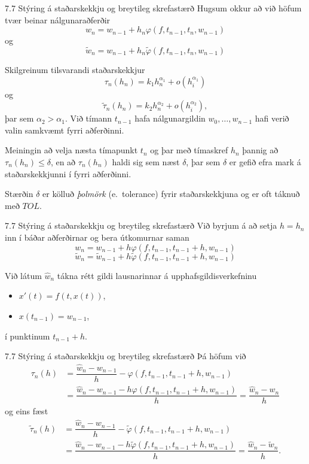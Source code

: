 \begin{frame}{7.7 Stýring á staðarskekkju og breytileg skrefastærð} 
Hugsum okkur að við höfum tvær beinar nálgunaraðferðir
$$
 w_{n} = w_{n-1} + h_n\varphi(f,t_{n-1},t_n,w_{n-1})
$$
og
$$
  \tilde w_{n} = w_{n-1} + h_n\tilde\varphi(f,t_{n-1},t_n,w_{n-1})
$$

\pause
Skilgreinum tilsvarandi staðarskekkjur
  $$ \tau_n(h_n) = k_1h_n^{\alpha_1} + o(h_i^{\alpha_1}) 
$$
og
  $$ \tilde\tau_n(h_n) = k_2h_n^{\alpha_2} + o(h_i^{\alpha_2}),
$$
þar sem  $\alpha_2>\alpha_1$.  Við tímann $t_{n-1}$ hafa
nálgunargildin $w_0,\ldots,w_{n-1}$ hafi verið valin  samkvæmt 
fyrri aðferðinni.  

\pause
\smallskip
Meiningin að velja næsta tímapunkt $t_n$ og þar með tímaskref $h_n$
þannig að $\tau_n(h_n)\leq \delta$, en að $\tau_n(h_n)$ haldi sig
sem næst $\delta$, þar sem $\delta $ er gefið  efra mark á
staðarskekkjunni í fyrri aðferðinni.  

\pause
\smallskip
Stærðin $\delta$ er  kölluð 
{\it  þolmörk} (e.~tolerance) fyrir staðarskekkjuna 
og er oft táknuð með $TOL$.
\end{frame}


\begin{frame}{7.7 Stýring á staðarskekkju og breytileg skrefastærð} 
Við byrjum á að setja $h=h_{n}$ inn í báðar
aðferðirnar og bera útkomurnar  saman
  \[ w_{n} = w_{n-1} + h\varphi(f,t_{n-1},t_{n-1}+h,w_{n-1}) \]
  \[ \tilde w_{n} = \tilde w_{n-1} + 
h\tilde\varphi(f,t_{n-1},t_{n-1}+h,w_{n-1}) \]  

\pause
\smallskip
Við látum $\hat w_{n}$ tákna rétt gildi lausnarinnar á
upphafsgildisverkefninu 
\begin{itemize}
 \item $x'(t)=f(t,x(t))$, 
 \item $x(t_{n-1})=w_{n-1}$,
\end{itemize}
í punktinum $t_{n-1}+h$.
\end{frame}


\begin{frame}{7.7 Stýring á staðarskekkju og breytileg skrefastærð} 
Þá höfum við 
\begin{align*}
 \tau_n(h)&=\dfrac{\hat
w_{n}-w_{n-1}}{h}-\varphi(f,t_{n-1},t_{n-1}+h,w_{n-1})\\
&=\dfrac{\hat
w_{n}-w_{n-1}-h\varphi(f,t_{n-1},t_{n-1}+h,w_{n-1})}{h} 
=\dfrac {\hat w_{n}-w_{n}}{h}
\end{align*}
og eins fæst
\begin{align*}
\tilde \tau_n(h)
&=\dfrac{\hat
w_{n}-w_{n-1}}{h}-\tilde \varphi(f,t_{n-1},t_{n-1}+h,w_{n-1})\\
&=\dfrac{\hat
w_{n}-w_{n-1}-h\tilde \varphi(f,t_{n-1},t_{n-1}+h,w_{n-1})}{h} 
=\dfrac {\hat w_{n}-\tilde w_{n}}{h}. 
\end{align*}
\end{frame}


